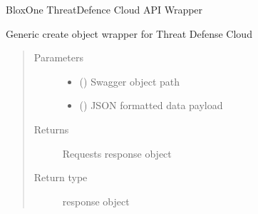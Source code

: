 \documentclass[letterpaper,10pt,english]{sphinxmanual}
\begin{document}
\begin{fulllineitems}
\label{\detokenize{b1tdc-class:bloxone.b1tdc}}
\sphinxAtStartPar
BloxOne ThreatDefence Cloud API Wrapper

\begin{fulllineitems}
\label{\detokenize{b1tdc-class:bloxone.b1tdc.create}}
\sphinxAtStartPar
Generic create object wrapper for Threat Defense Cloud
\begin{quote}\begin{description}
\item[{Parameters}] \leavevmode\begin{itemize}
\item {} 
\sphinxAtStartPar
{} () \textendash{} Swagger object path

\item {} 
\sphinxAtStartPar
{} () \textendash{} JSON formatted data payload

\end{itemize}

\item[{Returns}] \leavevmode
\sphinxAtStartPar
Requests response object

\item[{Return type}] \leavevmode
\sphinxAtStartPar
response object

\end{description}\end{quote}

\end{fulllineitems}



\end{fulllineitems}
\end{document}
